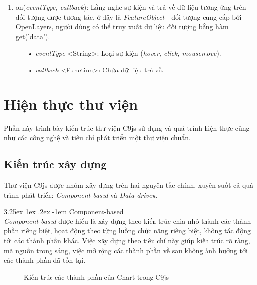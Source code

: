 \documentclass[12pt,a4paper]{article}
\makeatletter
\newcommand*\NewPage{\newpage\null\thispagestyle{empty}\newpage}
\newcommand{\myparagraph}[1]{\paragraph{#1}\mbox{}\\} %
\renewcommand\paragraph{\@startsection{paragraph}{5}{\z@}%
  {3.25ex \@plus1ex \@minus.2ex}%
  {-1em}%
  {\normalfont\normalsize\bfseries}}
\makeatother
\begin{document}
\begin{enumerate}
\item \textsf{on(\textit{eventType, callback})}: Lắng nghe sự kiện và trả về dữ liệu tương ứng trên đối tượng được tương tác, ở đây là \textit{FeatureObject} - đối tượng cung cấp bởi OpenLayers, người dùng có thể truy xuất dữ liệu đối tượng bằng hàm \textsf{get('data')}.
	\begin{itemize}
		\item[•] \textit{eventType} <String>: Loại sự kiện (\textit{hover, click, mousemove}).
		\item[•] \textit{callback} <Function>: Chứa dữ liệu trả về.
	\end{itemize}
\end{enumerate}

\clearpage
\NewPage
\section{Hiện thực thư viện}
Phần này trình bày kiến trúc thư viện C9js sử dụng và quá trình hiện thực cũng như các công nghệ và tiêu chí phát triển một thư viện chuẩn.
\subsection{Kiến trúc xây dựng}\label{sec:kientruc}
Thư viện C9js được nhóm xây dựng trên hai nguyên tắc chính, xuyên suốt cả quá trình phát triển: \textit{Component-based} và \textit{Data-driven}.

\myparagraph{Component-based} 
\textit{Component-based}\cite{component_based} được hiểu là xây dựng theo kiến trúc chia nhỏ thành các thành phần riêng biệt, họat động theo từng luồng chức năng riêng biệt, không tác động tới các thành phần khác. Việc xây dựng theo tiêu chí này giúp kiến trúc rõ ràng, mã nguồn trong sáng, việc mở rộng các thành phần về sau không ảnh hưởng tới các thành phần đã tồn tại.

\begin{figure}[!h]
	\begin{center}
    \caption{Kiến trúc các thành phần của Chart trong C9js}
    \label{fig:chart}
	\end{center}
\end{figure}
\end{document}
